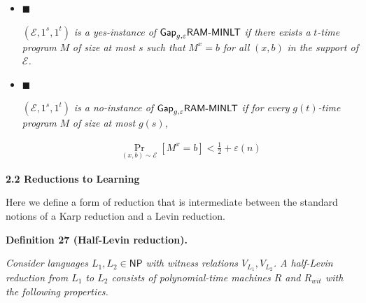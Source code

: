 \documentclass[10pt,a4paper]{article}
\begin{document}
\begin{itemize}


\item[] 
$\blacksquare$ 


$(\mathcal{E},1^{s},1^{t})$\emph{ is a yes-instance of }${\sf Gap}_{g,\varepsilon}{\sf RAM}\text{-}{\sf MINLT}$\emph{ if there exists a }$t$\emph{-time program }$M$\emph{ of size at most }$s$\emph{ such that }$M^{x}=b$\emph{ for all }$(x,b)$\emph{ in the support of }$\mathcal{E}$\emph{.}\par





\item[] 
$\blacksquare$ 


$(\mathcal{E},1^{s},1^{t})$\emph{ is a no-instance of }${\sf Gap}_{g,\varepsilon}{\sf RAM}\text{-}{\sf MINLT}$\emph{ if for every }$g(t)$\emph{-time program }$M$\emph{ of size at most }$g(s)$\emph{,}\par


\[\begin{gathered}
\Pr_{(x,b)\sim\mathcal{E}}[M^{x}=b]<\frac{1}{2}+\varepsilon(n)
\end{gathered}\]





\end{itemize}







\par\medskip\noindent\textbf{
2.2 Reductions to Learning}\par




Here we define a form of reduction that is intermediate between the standard notions of a Karp reduction and a Levin reduction.\par





\par\medskip\noindent\textbf{
\textbf{Definition 27}\textbf{ }(Half-Levin reduction)\textbf{.}
}\par



\emph{Consider languages $L_{1},L_{2}\in{\mathsf{NP}}$ with witness relations $V_{L_{1}},V_{L_{2}}$. A half-Levin reduction from $L_{1}$ to $L_{2}$ consists of polynomial-time machines $R$ and $R_{wit}$ with the following properties.}\par
\end{document}
